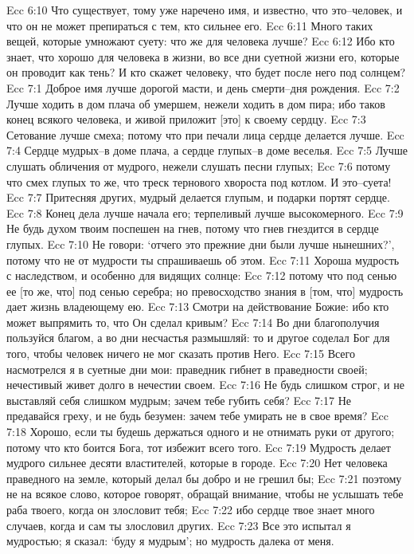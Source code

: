 Ecc 6:10  Что существует, тому уже наречено имя, и известно, что это--человек, и что он не может препираться с тем, кто сильнее его.
Ecc 6:11  Много таких вещей, которые умножают суету: что же для человека лучше?
Ecc 6:12  Ибо кто знает, что хорошо для человека в жизни, во все дни суетной жизни его, которые он проводит как тень? И кто скажет человеку, что будет после него под солнцем?
Ecc 7:1  Доброе имя лучше дорогой масти, и день смерти--дня рождения.
Ecc 7:2  Лучше ходить в дом плача об умершем, нежели ходить в дом пира; ибо таков конец всякого человека, и живой приложит [это] к своему сердцу.
Ecc 7:3  Сетование лучше смеха; потому что при печали лица сердце делается лучше.
Ecc 7:4  Сердце мудрых--в доме плача, а сердце глупых--в доме веселья.
Ecc 7:5  Лучше слушать обличения от мудрого, нежели слушать песни глупых;
Ecc 7:6  потому что смех глупых то же, что треск тернового хвороста под котлом. И это--суета!
Ecc 7:7  Притесняя других, мудрый делается глупым, и подарки портят сердце.
Ecc 7:8  Конец дела лучше начала его; терпеливый лучше высокомерного.
Ecc 7:9  Не будь духом твоим поспешен на гнев, потому что гнев гнездится в сердце глупых.
Ecc 7:10  Не говори: `отчего это прежние дни были лучше нынешних?', потому что не от мудрости ты спрашиваешь об этом.
Ecc 7:11  Хороша мудрость с наследством, и особенно для видящих солнце:
Ecc 7:12  потому что под сенью ее [то же, что] под сенью серебра; но превосходство знания в [том, что] мудрость дает жизнь владеющему ею.
Ecc 7:13  Смотри на действование Божие: ибо кто может выпрямить то, что Он сделал кривым?
Ecc 7:14  Во дни благополучия пользуйся благом, а во дни несчастья размышляй: то и другое соделал Бог для того, чтобы человек ничего не мог сказать против Него.
Ecc 7:15  Всего насмотрелся я в суетные дни мои: праведник гибнет в праведности своей; нечестивый живет долго в нечестии своем.
Ecc 7:16  Не будь слишком строг, и не выставляй себя слишком мудрым; зачем тебе губить себя?
Ecc 7:17  Не предавайся греху, и не будь безумен: зачем тебе умирать не в свое время?
Ecc 7:18  Хорошо, если ты будешь держаться одного и не отнимать руки от другого; потому что кто боится Бога, тот избежит всего того.
Ecc 7:19  Мудрость делает мудрого сильнее десяти властителей, которые в городе.
Ecc 7:20  Нет человека праведного на земле, который делал бы добро и не грешил бы;
Ecc 7:21  поэтому не на всякое слово, которое говорят, обращай внимание, чтобы не услышать тебе раба твоего, когда он злословит тебя;
Ecc 7:22  ибо сердце твое знает много случаев, когда и сам ты злословил других.
Ecc 7:23  Все это испытал я мудростью; я сказал: `буду я мудрым'; но мудрость далека от меня.
